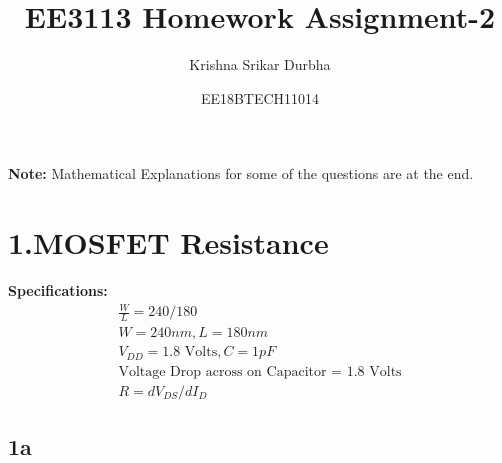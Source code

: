 \documentclass{article}
\title{EE3113 Homework Assignment-2}
\author{Krishna Srikar Durbha}
\date{EE18BTECH11014}
\begin{document}
\maketitle
\vspace{0.05in}
\textbf{Note:} Mathematical Explanations for some of the questions are at the end. 

\section{1.MOSFET Resistance}
\textbf{Specifications:}
\begin{align}
    \frac{W}{L} = 240/180\\
    W = 240nm, L = 180nm\\
    V_{DD} = 1.8 \text{ Volts}, C = 1pF\\
    \text{Voltage Drop across on Capacitor = $1.8$ Volts} \\
    R = dV_{DS}/dI_D
\end{align}
\subsection{1a}
\end{document}
